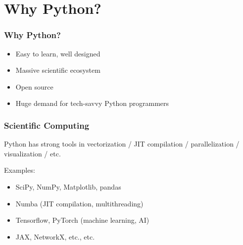 \documentclass[
    xcolor={svgnames},
    hyperref={colorlinks, citecolor=DeepPink4, linkcolor=DarkRed, urlcolor=DarkBlue}
    ]{beamer}  %
\newcommand{\1}{\mathbbm 1}
\begin{document}
\section{Why Python?}


\begin{frame}
    \frametitle{Why Python?}
    
    \begin{itemize}
        \item Easy to learn, well designed
            \vspace{0.5em}
        \item Massive scientific ecosystem
            \vspace{0.5em}
        \item Open source
            \vspace{0.5em}
        \item Huge demand for tech-savvy Python programmers
    \end{itemize}

\end{frame}


\begin{frame}
    \frametitle{Scientific Computing}
    
    Python has strong tools in vectorization / JIT compilation /
    parallelization / visualization / etc.

    Examples:

    \begin{itemize}
        \item SciPy, NumPy, Matplotlib, pandas
            \vspace{0.5em}
        \item Numba (JIT compilation, multithreading)
            \vspace{0.5em}
        \item Tensorflow, PyTorch (machine learning, AI)
            \vspace{0.5em}
        \item JAX, NetworkX, etc., etc.
    \end{itemize}

\end{frame}
\end{document}
